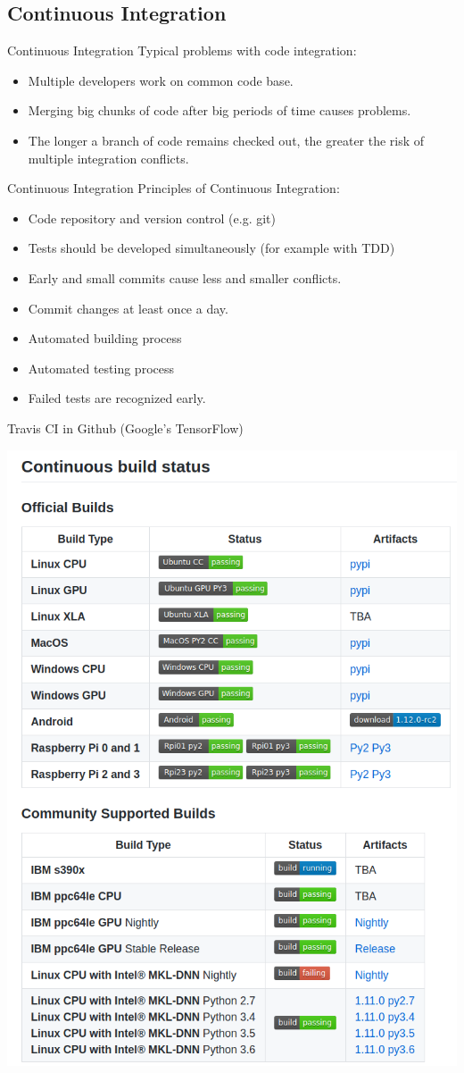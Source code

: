 \subsection{Continuous Integration}



\begin{Frame}{Continuous Integration}
	Typical problems with code integration:
	\xxx
	\begin{itemize}
		\item Multiple developers work on common code base.
		\item Merging big chunks of code after big periods of time causes problems.
		\item The longer a branch of code remains checked out, the greater the risk of multiple integration conflicts.
	\end{itemize}
\end{Frame}



\begin{Frame}{Continuous Integration}
	Principles of Continuous Integration:
	\xxx
	\begin{itemize}
		\item Code repository and version control (e.g. git)
		\item Tests should be developed simultaneously (for example with TDD)
		\item Early and small commits cause less and smaller conflicts.
		\item Commit changes at least once a day.
		\item Automated building process
		\item Automated testing process
		\item Failed tests are recognized early.
	\end{itemize}
\end{Frame}


\begin{Frame}{Travis CI in Github (Google's TensorFlow)}

	
\begin{center}
	\includegraphics[width=0.7\linewidth]{content/chapter_testing/integration/continuousIntegration}
\end{center}
\end{Frame}